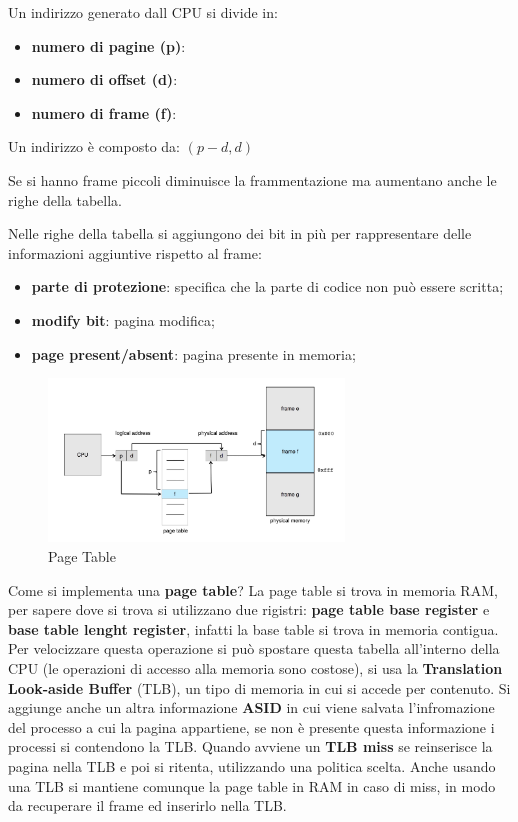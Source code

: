 \documentclass[12pt]{article}
\begin{document}
Un indirizzo generato dall CPU si divide in:
\begin{itemize}
  \item \textbf{numero di pagine (p)}: 
  \item \textbf{numero di offset (d)}:
  \item \textbf{numero di frame (f)}:
\end{itemize}
Un indirizzo \`e composto da: $(p-d, d)$
\begin{example}{}{}
  Se si hanno frame piccoli diminuisce la frammentazione ma aumentano anche le righe della tabella.
\end{example}
Nelle righe della tabella si aggiungono dei bit in pi\`u per rappresentare delle informazioni aggiuntive rispetto al frame:
\begin{itemize}
  \item \textbf{parte di protezione}: specifica che la parte di codice non pu\`o essere scritta;
  \item \textbf{modify bit}: pagina modifica;
  \item \textbf{page present/absent}:  pagina presente in memoria;
\end{itemize}
\begin{figure}[H]
  \centering
  \includegraphics[width=0.7\textwidth]{page-table.png}
  \caption{Page Table}
  \label{fig:page-table}
\end{figure}
Come si implementa una \textbf{page table}? La page table si trova in memoria RAM, per sapere dove si trova si utilizzano due rigistri: \textbf{page table base register} e \textbf{base table lenght register}, infatti la base table si trova in memoria contigua. Per velocizzare questa operazione si pu\`o spostare questa tabella all'interno della CPU (le operazioni di accesso alla memoria sono costose), si usa la \textbf{Translation Look-aside Buffer} (TLB), un tipo di memoria in cui si accede per contenuto. Si aggiunge anche un altra informazione \textbf{ASID} in cui viene salvata l'infromazione del processo a cui la pagina appartiene, se non \`e presente questa informazione i processi si contendono la TLB. Quando avviene un \textbf{TLB miss} se reinserisce la pagina nella TLB e poi si ritenta, utilizzando una politica scelta. Anche usando una TLB si mantiene comunque la page table in RAM in caso di miss, in modo da recuperare il frame ed inserirlo nella TLB.
\begin{center}
\end{center}
\end{document}
